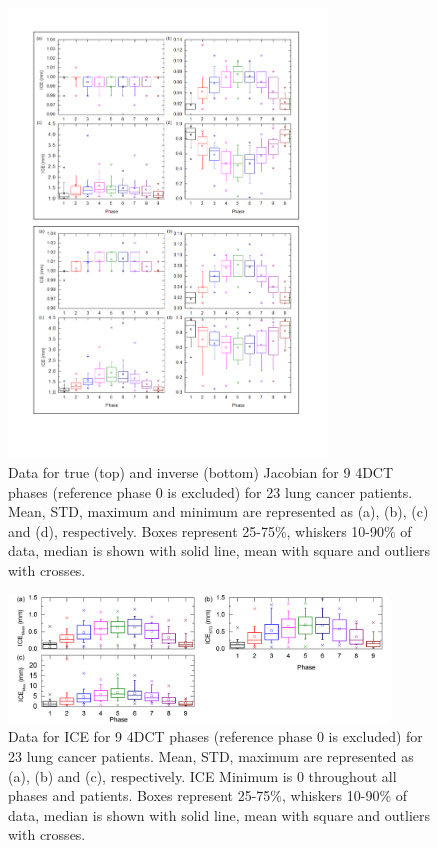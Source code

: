 \documentclass[type=dr, dr=rernat, accentcolor=tud7b,colorbacktitle, bigchapter, openright, twoside, 12pt ]{tudthesis}
\begin{document}
\begin{figure}[H]
	\begin{center}		
		\includegraphics[width=0.75\textwidth]{./Images/Jacobian_data.png}
		\caption{Data for true (top) and inverse (bottom) Jacobian for 9 4DCT phases (reference phase 0 is excluded) for 23 lung cancer patients. Mean, STD, maximum and minimum are represented as (a), (b), (c) and (d), respectively.
		Boxes represent 25-75\%, whiskers 10-90\% of data, median is shown with solid line, mean with square and outliers with crosses.}
		\label{jacobian_data}
	\end{center}
\end{figure}

\newpage

\begin{figure}[H]
	\begin{center}		
		\includegraphics[width=0.9\textwidth]{./Images/ICE.png}
		\caption{Data for ICE for 9 4DCT phases (reference phase 0 is excluded) for 23 lung cancer patients. Mean, STD, maximum are represented as (a), (b) and (c), respectively. ICE Minimum is 0 throughout all phases and patients.
		Boxes represent 25-75\%, whiskers 10-90\% of data, median is shown with solid line, mean with square and outliers with crosses.}
		\label{ice}
	\end{center}
\end{figure}
\end{document}
